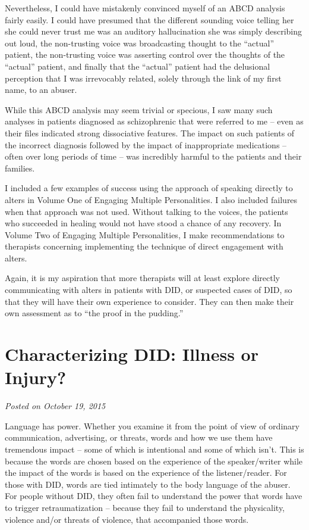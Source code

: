 \documentclass[]{book}
\begin{document}
Nevertheless, I could have mistakenly convinced myself of an ABCD analysis fairly easily. I could have presumed that the different sounding voice telling her she could never trust me was an auditory hallucination she was simply describing out loud, the non-trusting voice was broadcasting thought to the ``actual'' patient, the non-trusting voice was asserting control over the thoughts of the ``actual'' patient, and finally that the ``actual'' patient had the delusional perception that I was irrevocably related, solely through the link of my first name, to an abuser.

While this ABCD analysis may seem trivial or specious, I saw many such analyses in patients diagnosed as schizophrenic that were referred to me -- even as their files indicated strong dissociative features. The impact on such patients of the incorrect diagnosis followed by the impact of inappropriate medications -- often over long periods of time -- was incredibly harmful to the patients and their families.

I included a few examples of success using the approach of speaking directly to alters in Volume One of Engaging Multiple Personalities. I also included failures when that approach was not used. Without talking to the voices, the patients who succeeded in healing would not have stood a chance of any recovery. In Volume Two of Engaging Multiple Personalities, I make recommendations to therapists concerning implementing the technique of direct engagement with alters.

Again, it is my aspiration that more therapists will at least explore directly communicating with alters in patients with DID, or suspected cases of DID, so that they will have their own experience to consider. They can then make their own assessment as to ``the proof in the pudding.''

\hypertarget{characterizing-did-illness-or-injury}{%
\section{Characterizing DID: Illness or Injury?}\label{characterizing-did-illness-or-injury}}

\emph{Posted on October 19, 2015}

Language has power. Whether you examine it from the point of view of ordinary communication, advertising, or threats, words and how we use them have tremendous impact -- some of which is intentional and some of which isn't. This is because the words are chosen based on the experience of the speaker/writer while the impact of the words is based on the experience of the listener/reader. For those with DID, words are tied intimately to the body language of the abuser. For people without DID, they often fail to understand the power that words have to trigger retraumatization -- because they fail to understand the physicality, violence and/or threats of violence, that accompanied those words.
\end{document}
